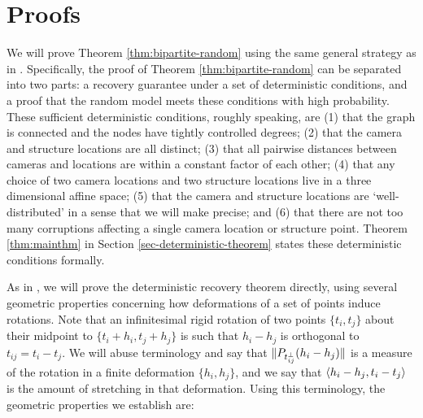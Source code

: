 

\section{Proofs} \label{sec-proofs-high-d}

We will prove Theorem \ref{thm:bipartite-random} using the same general strategy as in \cite{HLV2015}.  Specifically, the proof of Theorem \ref{thm:bipartite-random} can be separated into two parts:  a recovery guarantee under a set of deterministic conditions, and a proof that the random model meets these conditions with high probability.  These sufficient deterministic conditions, roughly speaking, are (1) that the graph is connected and the nodes have tightly controlled degrees; (2) that the camera and structure locations are all distinct;  (3) that all pairwise distances between cameras and locations are within a constant factor of each other; (4) that any choice of two camera locations and two structure locations live in a three dimensional affine space; (5) that the camera and structure locations are `well-distributed' in a sense that we will make precise; and (6) that there are not too many corruptions affecting a single camera location or structure point.  Theorem \ref{thm:mainthm} in Section \ref{sec-deterministic-theorem} states these deterministic conditions formally.

As in \cite{HLV2015}, we will prove the deterministic recovery theorem directly, using several geometric properties concerning how deformations of a set of points induce rotations. 
Note that an infinitesimal rigid rotation of two points $\{t_i, t_j\}$ about their midpoint to ${\{t_i + h_i, t_j + h_j\}}$ is such that $h_i - h_j$ is orthogonal to $t_{ij} = t_i - t_j$.  We will abuse terminology and say that $\|P_{t_{ij}^\perp} (h_i - h_j)\|$ is a measure of the rotation in a finite deformation $\{h_i, h_j\}$, and we say that $\langle h_i - h_j, t_{i} - t_{j} \rangle$ is the amount of stretching in that deformation. Using this terminology, the geometric properties we establish are:

